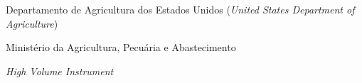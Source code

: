 \begin{siglas}
    \item[USDA] Departamento de Agricultura dos Estados Unidos (\textit{United States Department of Agriculture})
    \item[MAPA] Ministério da Agricultura, Pecuária e Abastecimento
    \item[HVI] \textit{High Volume Instrument}
\end{siglas}
